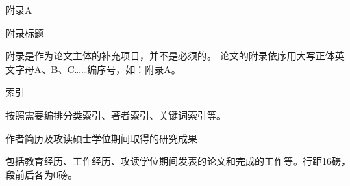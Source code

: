 \documentclass{bjtuthesis}
\begin{document}
% 

\newpage
\pagestyle{myfancy}
\nocite{*}
\printbibliography[heading=myheading]
\cleardoublepage
\begin{center}
    {\heiti 附录A}
\end{center}
\begin{center}
    {\heiti 附录标题}
\end{center}

\indent{}附录是作为论文主体的补充项目，并不是必须的。
论文的附录依序用大写正体英文字母A、B、C……编序号，如：附录A。
\cleardoublepage
\begin{center}
    {\heiti 索引}
\end{center}

\indent{}按照需要编排分类索引、著者索引、关键词索引等。
\cleardoublepage
\begin{thecenter}
    作者简历及攻读硕士学位期间取得的研究成果
\end{thecenter}

包括教育经历、工作经历、攻读学位期间发表的论文和完成的工作等。行距16磅，段前后各为0磅。
\cleardoublepage
\cstatement
\clastpage
\end{document}
